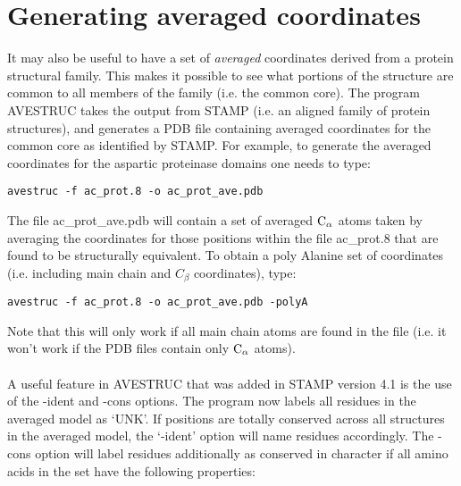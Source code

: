 \section{Generating averaged coordinates}

It may also be useful to have a set of {\em averaged} coordinates derived 
from a protein structural family.  This makes it possible to see what 
portions of the structure are common to all members of the family (i.e. 
the common core).  The program AVESTRUC takes the output from STAMP 
(i.e. an aligned family of protein structures), and generates a PDB file 
containing averaged coordinates for the common core as identified by 
STAMP.  For example, to generate the averaged coordinates for the 
aspartic proteinase domains one needs to type:\\

\begin{scriptsize}\begin{verbatim}
avestruc -f ac_prot.8 -o ac_prot_ave.pdb
\end{verbatim} \end{scriptsize}

The file ac\_prot\_ave.pdb will contain a set of averaged ${\rm C}_{\alpha}$ atoms taken 
by averaging the coordinates for those positions within the file 
ac\_prot.8 that are found to be structurally equivalent.  To obtain a poly 
Alanine set of coordinates (i.e. including main chain and $C_{\beta}$ 
coordinates), type:\\

\begin{scriptsize}\begin{verbatim}
avestruc -f ac_prot.8 -o ac_prot_ave.pdb -polyA
\end{verbatim} \end{scriptsize}

Note that this will only work if all main chain atoms are found in the file
(i.e. it won't work if the PDB files contain only ${\rm C}_{\alpha}$ atoms).\\
\\
A useful feature in AVESTRUC that was added in STAMP version 4.1 is the use of the -ident
and -cons options.  The program now labels all residues in the averaged model 
as `UNK'.  If positions are totally conserved across all structures in the
averaged model, the `-ident' option will name residues accordingly.  The -cons
option will label residues additionally as conserved in character if all
amino acids in the set have the following properties:\\

